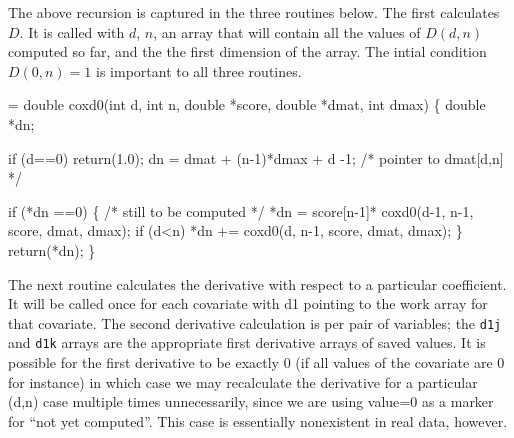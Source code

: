 \documentclass{article}
\begin{document}
The above recursion is captured in the three routines below.
The first calculates $D$. 
It is called with $d$, $n$, an array that will contain all the 
values of $D(d,n)$ computed so far, and the the first dimension of the array.
The intial condition $D(0,n)=1$ is important to all three routines.

\begin{nwchunk}
=
 double coxd0(int d, int n, double *score, double *dmat,
              int dmax) \{
     double *dn;
     
     if (d==0) return(1.0);
     dn = dmat + (n-1)*dmax + d -1;  /* pointer to dmat[d,n] */
 
     if (*dn ==0) \{  /* still to be computed */
         *dn = score[n-1]* coxd0(d-1, n-1, score, dmat, dmax);
             if (d<n) *dn += coxd0(d, n-1, score, dmat, dmax);
     \}
     return(*dn);
 \}
\end{nwchunk}

The next routine calculates the derivative with respect to a particular
coefficient. It will be called once for each covariate with d1 pointing to
the work array for that covariate.
The second derivative calculation is per pair of variables; the
\texttt{d1j} and \texttt{d1k} arrays are the appropriate first derivative
arrays of saved values.
It is possible for the first derivative to be exactly 0 (if all values
of the covariate are 0 for instance) in which case we may recalculate the
derivative for a particular (d,n) case multiple times unnecessarily, 
since we are using value=0 as a marker for
``not yet computed''.           
This case is essentially nonexistent in real data, however.
\end{document}
